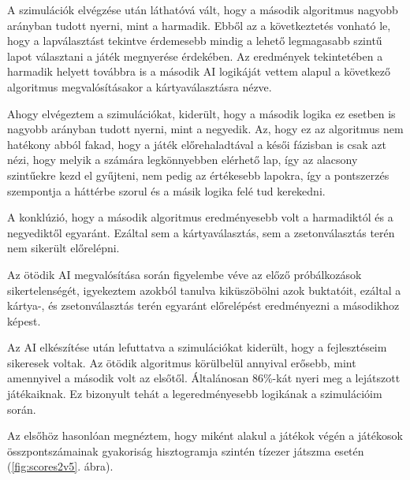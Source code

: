 
A szimulációk elvégzése után láthatóvá vált, hogy a második algoritmus nagyobb arányban tudott nyerni, mint a harmadik. Ebből az a következtetés vonható le, hogy a lapválasztást tekintve érdemesebb mindig a lehető legmagasabb szintű lapot választani a játék megnyerése érdekében. Az eredmények tekintetében a harmadik helyett továbbra is a második AI logikáját vettem alapul a következő algoritmus megvalósításakor a kártyaválasztásra nézve.


Ahogy elvégeztem a szimulációkat, kiderült, hogy a második logika ez esetben is nagyobb arányban tudott nyerni, mint a negyedik. Az, hogy ez az algoritmus nem hatékony abból fakad, hogy a játék előrehaladtával a késői fázisban is csak azt nézi, hogy melyik a számára legkönnyebben elérhető lap, így az alacsony szintűekre kezd el gyűjteni, nem pedig az értékesebb lapokra, így a pontszerzés szempontja a háttérbe szorul és a másik logika felé tud kerekedni.

A konklúzió, hogy a második algoritmus eredményesebb volt a harmadiktól és a negyediktől egyaránt. Ezáltal sem a kártyaválasztás, sem a zsetonválasztás terén nem sikerült előrelépni.




Az ötödik AI megvalósítása során figyelembe véve az előző próbálkozások sikertelenségét, igyekeztem azokból tanulva kiküszöbölni azok buktatóit, ezáltal a kártya-, és zsetonválasztás terén egyaránt előrelépést eredményezni a másodikhoz képest.

Az AI elkészítése után lefuttatva a szimulációkat kiderült, hogy a fejlesztéseim sikeresek voltak.
Az ötödik algoritmus körülbelül annyival erősebb, mint amennyivel a második volt az elsőtől. Általánosan 86\%-kát nyeri meg a lejátszott játékaiknak. Ez bizonyult tehát a legeredményesebb logikának a szimulációim során.

Az elsőhöz hasonlóan megnéztem, hogy miként alakul a játékok végén a játékosok összpontszámainak gyakoriság hisztogramja szintén tízezer játszma esetén (\ref{fig:scores2v5}. ábra).

